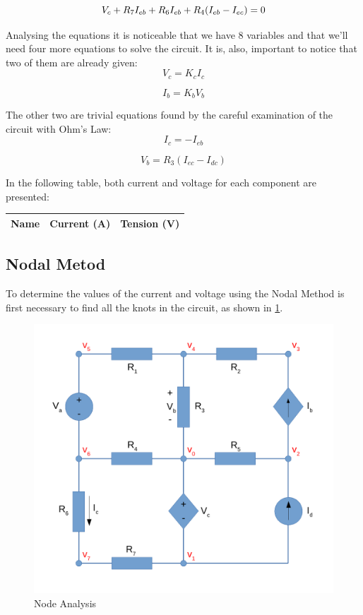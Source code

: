 \begin{equation}
     V_{c} + R_{7} I_{eb} + R_{6} I_{eb} + R_{4} (I_{eb} - I_{ec}) = 0
      \label{eq:KVL_{eb}}
\end{equation}

\vspace{0.1cm}
Analysing the equations it is noticeable that we have 8 variables and that we'll need four more equations to solve the circuit. It is, also, important to notice that two of them are already given:
\begin{equation}
    V_{c} = K_{c} I_{c}
\end{equation}

\begin{equation}
    I_{b} = K_{b} V_{b}
\end{equation}

\vspace{0.1cm}
The other two are trivial equations found by the careful examination of the circuit with Ohm's Law:
\vspace{0.1cm}
\begin{equation}
    I_{c} = -I_{eb}
\end{equation}

\begin{equation}
    V_{b} = R_{3} (I_{ec} - I_{dc})
\end{equation}

\pagebreak
In the following table, both current and voltage for each component are presented:
\begin{center}
\begin{tabular}{ |c|c|c| }
 \hline
\textbf{Name} & \textbf{Current (A)} & \textbf{Tension (V)} \\
 \hline
 
\end{tabular}
\end{center}

\subsection{Nodal Metod}
To determine the values of the current and voltage using the Nodal Method is first necessary to find all the knots in the circuit, as shown in \ref{fig:NodeAnalysis}.

\begin{figure}[h] \centering
\includegraphics[width=0.4\linewidth]{NodeAnalysis.pdf}
\caption{Node Analysis}
\label{fig:NodeAnalysis}
\end{figure}


